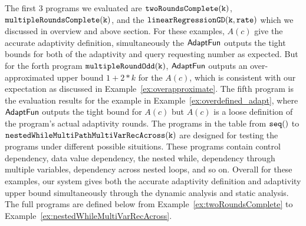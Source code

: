 The first 3 programs we evaluated are $ \mathtt{twoRoundsComplete(k)}$, $ \mathtt{multipleRoundsComplete(k)}$, 
and the $\mathtt{linearRegressionGD(k, rate)}$ which we discussed in overview and above section.
For these examples, $A(c)$ 
give the accurate adaptivity definition, 
simultaneously the $\textsf{AdaptFun}$ outputs the tight bounds for both of the adaptivity and query requesting number as expected.
But for the forth program $\mathtt{multipleRoundOdd(k)}$, $\textsf{AdaptFun}$ outputs an over-approximated upper bound $1 + 2*k$ for the $A(c)$, which is consistent with our expectation as discussed in Example~\ref{ex:overapproximate}. 
The fifth program is the evaluation results for the example in Example~\ref{ex:overdefined_adapt}, where $\textsf{AdaptFun}$ outputs
the tight bound for $A(c)$ but $A(c)$ is a loose definition of the program's actual adaptivity rounds.
%
The programs in the table from  $\mathtt{seq()}$ to $ \mathtt{nestedWhileMultiPathMultiVarRecAcross(k)}$ are 
designed for testing the programs under different possible situitions.
These programs contain control dependency, data value dependency,
the nested while, dependency through multiple variables, dependency across nested loops, and so on. 
Overall for these examples, our system gives both the accurate adaptivity definition and 
adaptivity upper bound simultaneously through the dynamic analysis and 
static analysis.
The full programs are defined below from Example~\ref{ex:twoRoundsComplete} to Example~\ref{ex:nestedWhileMultiVarRecAcross}.
%
